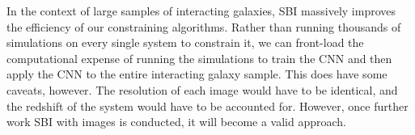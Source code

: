 In the context of large samples of interacting galaxies, SBI massively improves the efficiency of our constraining algorithms. Rather than running thousands of simulations on every single system to constrain it, we can front-load the computational expense of running the simulations to train the CNN and then apply the CNN to the entire interacting galaxy sample. This does have some caveats, however. The resolution of each image would have to be identical, and the redshift of the system would have to be accounted for. However, once further work SBI with images is conducted, it will become a valid approach. 